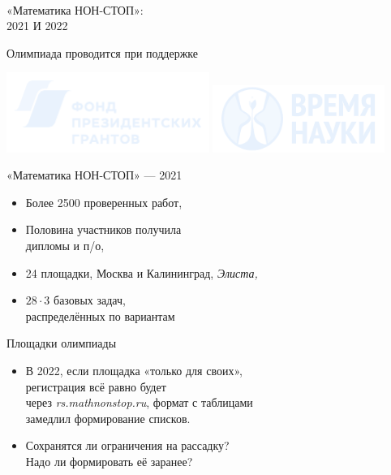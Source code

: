 \documentclass[17pt]{extarticle}
\newcommand{\newslide}[1]{\newpage \begin{center} \large #1 \end{center}}
\begin{document}
\ \\ [1cm]

\begin{center} \Large «Математика НОН-СТОП»:\medskip \\ 2021 И 2022 \end{center}

\newslide{Олимпиада проводится при поддержке}

\begin{center}
	\includegraphics[height=2.6cm]{fig/fpg}\quad
	\includegraphics[height=2.2cm]{fig/vn}
\end{center}

\newslide{«Математика НОН-СТОП» — 2021}

\begin{itemize}
	\item Более 2500 проверенных работ,
	\item Половина участников получила\\ дипломы и п/о,
	\item 24 площадки, Москва и Калининград, {\it Элиста,}
	\item \( 28 \cdot 3\) базовых задач,\\ распределённых по вариантам
\end{itemize}

\newslide{Площадки олимпиады}

\begin{itemize}
	\item В 2022, если площадка «только для своих»,\\
	регистрация всё равно будет\\
	через {\it rs.mathnonstop.ru}, формат с таблицами\\
	замедлил формирование списков.
	\item Сохранятся ли ограничения на рассадку?\\ Надо ли формировать её заранее?
\end{itemize}
\end{document}
